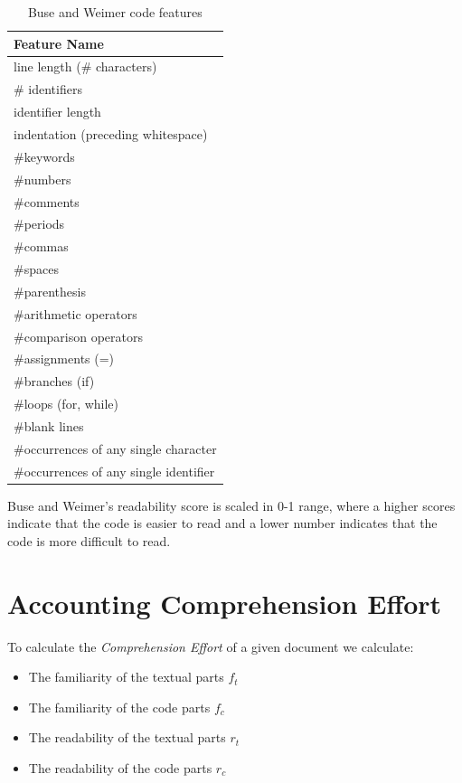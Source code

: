 \documentclass[12pt,mscthesis]{usiinfthesis}
\begin{document}
	\begin {table}[H]
	\begin{center}
    \begin{tabular}{ | l | }
    \hline
    \textbf{Feature Name}\\ \hline
	line length (\# characters)\\ \hline
 	\# identifiers\\ \hline
 	identifier length\\ \hline
	indentation (preceding whitespace)\\ \hline
	\#keywords\\ \hline
	 \#numbers\\ \hline
	\#comments\\ \hline
	\#periods\\ \hline
	\#commas\\ \hline
	\#spaces\\ \hline
	\#parenthesis\\ \hline
	 \#arithmetic operators\\ \hline
	 \#comparison operators\\ \hline
	 \#assignments (=)\\ \hline
	 \#branches (if)\\ \hline
	 \#loops (for, while)\\ \hline
	 \#blank lines\\ \hline
	 \#occurrences of any single character\\ \hline
	 \#occurrences of any single identifier\\ \hline
    \end{tabular}
	\end{center}
		\caption{Buse and Weimer code features} \label{tab:Buse and Weimer} 
	\end{table}

	Buse and Weimer's readability score is scaled in 0-1 range, where a higher scores indicate that the code is easier to read and a lower number indicates that the code is more difficult to read.


\section{Accounting Comprehension Effort }

To calculate the \emph{Comprehension Effort} of a given document we calculate:
\begin{itemize}
\item The familiarity of the textual parts $f_{t}$ 
\item The familiarity of the code parts $f_{c}$
\item The readability of the textual parts $r_{t}$
\item The readability of the code parts $r_{c}$ 
\end{itemize}
 
\end{document}
